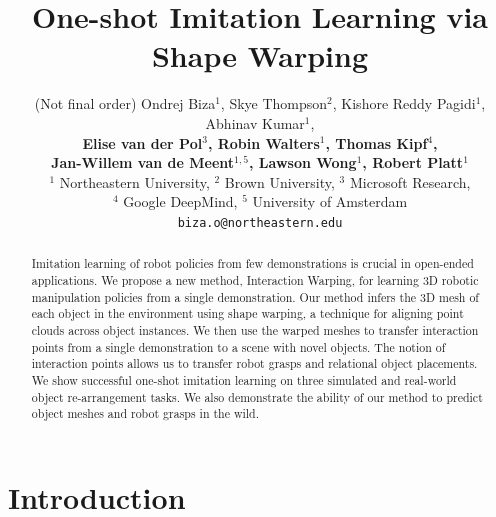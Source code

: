 \documentclass{article}
\title{One-shot Imitation Learning via Shape Warping}
\author{
  (Not final order) Ondrej Biza$^1$, Skye Thompson$^2$, Kishore Reddy Pagidi$^1$, Abhinav Kumar$^1$, \\
  \textbf{Elise van der Pol$^3$, Robin Walters$^1$, Thomas Kipf$^4$,} \\
  \textbf{Jan-Willem van de Meent$^{1,5}$, Lawson Wong$^1$, Robert Platt$^1$} \\
  $^1$ Northeastern University, $^2$ Brown University, $^3$ Microsoft Research, \\$^4$ Google DeepMind, $^5$ University of Amsterdam \\
  \texttt{biza.o@northeastern.edu} \\
}
\newcommand{\ob}[1]{\textcolor{purple}{[\textbf{OB:} #1]}}
\begin{document}
\maketitle


\begin{abstract}
Imitation learning of robot policies from few demonstrations is crucial in open-ended applications. We propose a new method, Interaction Warping, for learning 3D robotic manipulation policies from a single demonstration. Our method infers the 3D mesh of each object in the environment using shape warping, a technique for aligning point clouds across object instances. We then use the warped meshes to transfer interaction points from a single demonstration to a scene with novel objects. The notion of interaction points allows us to transfer robot grasps and relational object placements. We show successful one-shot imitation learning on three simulated and real-world object re-arrangement tasks. We also demonstrate the ability of our method to predict object meshes and robot grasps in the wild.
\end{abstract}




\section{Introduction}


\end{document}
